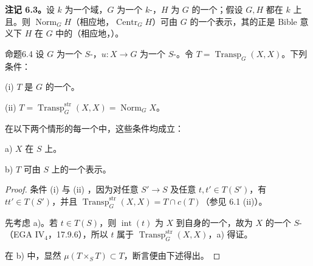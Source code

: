 \textbf{注记 6.3。}设 $k$ 为一个域，$G$ 为一个 $k$-，$H$ 为 $G$ 的一个；假设 $G,H$ 都在 $k$ 上且。则 $\operatorname{Norm}_G H$（相应地，$\operatorname{Centr}_G H$）可由 $G$ 的一个表示，其的正是 Bible 意义下 $H$ 在 $G$ 中的（相应地，）。

\begin{SGAresult}{命题}{6.4}
设 $G$ 为一个 $S$-，$u:X\to G$ 为一个 $S$-。令 $T=\operatorname{Transp}_G(X,X)$。下列条件：

(i) $T$ 是 $G$ 的一个。

(ii) $T=\operatorname{Transp}^{\mathrm{str}}_G(X,X)=\operatorname{Norm}_G X$。

在以下两个情形的每一个中，这些条件均成立：

a) $X$ 在 $S$ 上。

b) $T$ 可由 $S$ 上的一个表示。
\end{SGAresult}
\begin{proof}
条件 (i) 与 (ii) ，因为对任意 $S'\to S$ 及任意 $t,t'\in T(S')$，有 $tt'\in T(S')$，并且 $\operatorname{Transp}^{\mathrm{str}}_G(X,X)=T\cap c(T)$（参见 6.1 (ii)）。

先考虑 a)。若 $t\in T(S)$，则 $\operatorname{int}(t)$ 为 $X$ 到自身的一个，故为 $X$ 的一个 $S$-（EGA $\mathrm{IV}_4$，17.9.6），所以 $t$ 属于 $\operatorname{Transp}^{\mathrm{str}}_G(X,X)$，a) 得证。

在 b) 中，显然 $\mu(T\times_S T)\subset T$，断言便由下述得出。
\end{proof}


